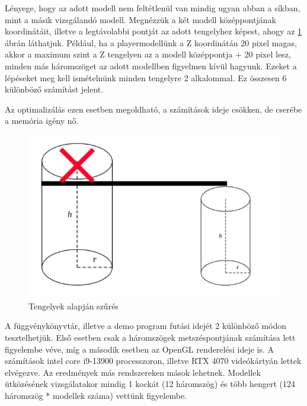 \newpage
{}
Lényege, hogy az adott modell nem feltétlenül van mindig ugyan abban a síkban, mint a másik vizsgálandó modell. Megnézzük a két modell középpontjának koordinátáit, illetve a legtávolabbi pontját az adott tengelyhez képest, ahogy az \ref{fig:opt_3} ábrán láthatjuk. Például, ha a playermodellünk a Z koordinátán 20 pixel magas, akkor a maximum szint a Z tengelyen az a modell középpontja + 20 pixel lesz, minden más háromszöget az adott modellben figyelmen kívül hagyunk. Ezeket a lépéseket meg kell ismételnünk minden tengelyre 2 alkalommal. Ez összesen 6 különböző számítást jelent.

Az optimalizálás ezen esetben megoldható, a számítások ideje csökken, de cserébe a memória igény nő.
\begin{figure}[h]
	\centering
	\includegraphics[width=13truecm, height=7.5truecm]{images/opt_5.3.png}
	\caption{Tengelyek alapján szűrés}
	\label{fig:opt_3}
\end{figure}
\newpage
{}
A függvénykönyvtár, illetve a demo program futási idejét 2 különböző módon tesztelhetjük. Első esetben csak a háromszögek metszéspontjának számítása lett figyelembe véve, míg a második esetben az OpenGL \cite{OpenGL} renderelési ideje is.
A számítások intel core i9-13900 processzoron, illetve RTX 4070 videókártyán lettek elvégezve. Az eredmények más rendszereken mások lehetnek. Modellek ütközésének vizsgálatakor mindig 1 kockát (12 háromszög) és több hengert (124 háromszög * modellek száma) vettünk figyelembe.
